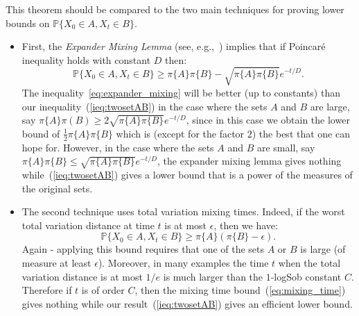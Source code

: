 \documentclass[11pt]{amsart}
\newcommand{\PP}{\mathbb{P}}
\newcommand{\eps}{\epsilon}
\newcommand{\1}{\mathbf{1}}
\theoremstyle{definition}
\theoremstyle{plain}
\theoremstyle{remark}
\numberwithin{equation}{section}
\begin{document}
This theorem should be compared to the two main techniques for proving lower bounds on $\PP\{ X_0 \in A, X_t \in B \}$.
\begin{itemize}
\item
First, the {\em Expander Mixing Lemma} (see, e.g.,~\cite[Chapter 9]{AlonSpencer}) implies that if Poincar\'e inequality holds with constant $D$ then:
\begin{equation} \label{eq:expander_mixing}
\PP\{ X_0 \in A, X_t \in B \} \geq \pi\{A\} \pi\{B\}  - \sqrt{\pi\{A\} \pi\{B\} } e^{-t/D}.
\end{equation}
The inequality~\eqref{eq:expander_mixing} will be better (up to constants) than our inequality~(\ref{ieq:twosetAB}) in the case where the sets
$A$ and $B$ are large,
say  $\pi\{A\} \pi(B) \geq 2 \sqrt{\pi\{A\} \pi\{B\} } e^{-t/D}$, since in this case we obtain the lower bound of $\frac{1}{2}\pi\{A\} \pi\{B\} $ which is
(except for the factor $2$) the best that one can hope for. However, in the case where the sets $A$ and $B$ are small, say
$\pi\{A\} \pi\{B\}  \leq \sqrt{\pi\{A\} \pi\{B\} } e^{-t/D}$, the expander mixing lemma gives nothing while~(\ref{ieq:twosetAB}) gives a lower bound
that is a power of the measures of the original sets.
\item
The second technique uses total variation mixing times. Indeed, if the worst total variation distance at time $t$ is at most $\eps$, then
we have:
\begin{equation} \label{eq:mixing_time}
\PP\{ X_0 \in A, X_t \in B \} \geq \pi\{A\} (\pi\{B\} - \eps).
\end{equation}
Again - applying this bound requires that one of the sets $A$ or $B$ is large (of measure at least $\eps$).
Moreover, in many examples the time $t$ when the total variation distance
is at most $1/e$ is much larger than the $1$-logSob constant $C$. Therefore if $t$ is of order $C$, then the mixing time bound~(\ref{eq:mixing_time})
gives nothing while our result~(\ref{ieq:twosetAB}) gives an efficient lower bound.
\end{itemize}
\end{document}
